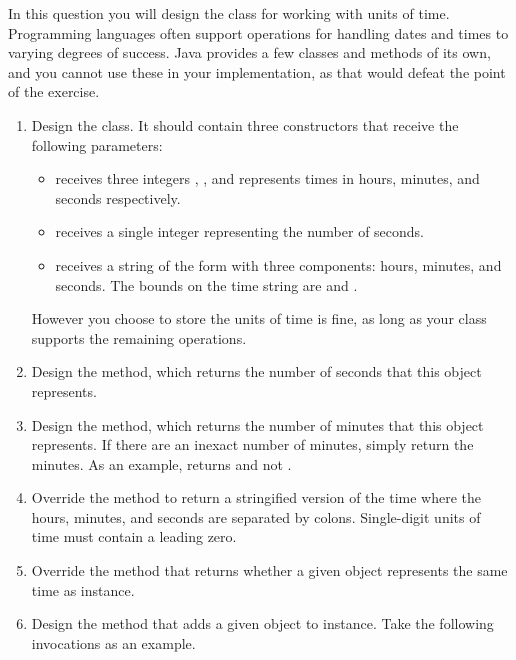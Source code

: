 In this question you will design the  class for working with units of time. 
Programming languages often support operations for handling dates and times to varying degrees of success.
Java provides a few classes and methods of its own, and you cannot use these in your implementation, as that would defeat the point of the exercise.
\begin{enumerate}[label=(\alph*)]
  \item Design the  class. It should contain three constructors that receive the following parameters:
  \begin{itemize}
    \item {} receives three integers , , and  represents times in hours, minutes, and seconds respectively.
    \item {} receives a single integer  representing the number of seconds.
    \item {} receives a string of the form  with three components: hours, minutes, and seconds. The bounds on the time string are  and .
  \end{itemize}
  However you choose to store the units of time is fine, as long as your class supports the remaining operations.
  \item Design the  method, which returns the number of seconds that this  object represents.
  \item Design the  method, which returns the number of minutes that this  object represents. If there are an inexact number of minutes, simply return the minutes. As an example,  returns  and not .
  \item Override the  method to return a stringified version of the time where the hours, minutes, and seconds are separated by colons. Single-digit units of time must contain a leading zero.
  \item Override the  method that returns whether a given  object represents the same time as  instance.
  \item Design the  method that adds a given  object to  instance. Take the following invocations as an example.
  \begin{verbnobox}[\small]

\end{verbnobox}
\end{enumerate}

